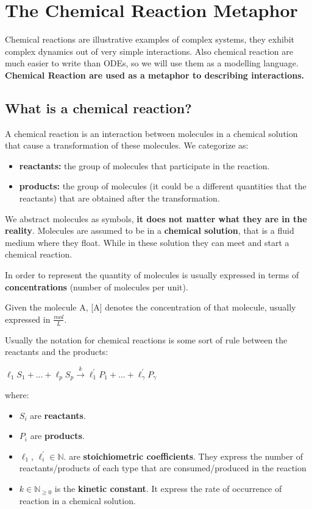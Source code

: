 \chapter{The Chemical Reaction Metaphor}

Chemical reactions are illustrative examples of complex systems, they exhibit complex dynamics out of very simple interactions. 
Also chemical reaction are much easier to write than ODEs, so we will use them as a modelling language. \textbf{Chemical Reaction are used as a metaphor to describing interactions.}

\section{What is a chemical reaction?}
A chemical reaction is an interaction between molecules in a chemical solution that cause a transformation of these molecules. We categorize as:

\begin{itemize}
    \item \textbf{reactants:} the group of molecules that participate in the reaction.
    \item \textbf{products:} the group of molecules (it could be a different quantities that the reactants) that are obtained after the transformation.
\end{itemize}

We abstract molecules as symbols, \textbf{it does not matter what they are in the reality}. Molecules are assumed to be in a \textbf{chemical solution}, that is a fluid medium where they float. While in these solution they can meet and start a chemical reaction.\par
In order to represent the quantity of molecules is usually expressed in terms of \textbf{concentrations} (number of molecules per unit). \par
Given the molecule A, [A] denotes the concentration of that molecule, usually expressed in $\frac{mol}{L}$. \par

Usually the notation for chemical reactions is some sort of rule between the reactants and the products:

\begin{center}
    $\ell_1 S_1 + ... + \ell_p S_p \xrightarrow{k} \ell^{'}_1 P_1 + ... + \ell^{'}_\gamma P_\gamma$
\end{center}
where:
\begin{itemize}
    \item $S_i$ are \textbf{reactants}.
    \item $P_i$ are \textbf{products}.
    \item $\ell_{1}$, $\ell^{'}_{i} \in \mathbb{N}.$ are \textbf{stoichiometric coefficients}. They express the number of reactants/products of each type that are consumed/produced in the reaction
    \item $k \in \mathbb{N}_{\geq 0}$ is the \textbf{kinetic constant}. It express the rate of occurrence of reaction in a chemical solution.
\end{itemize}

